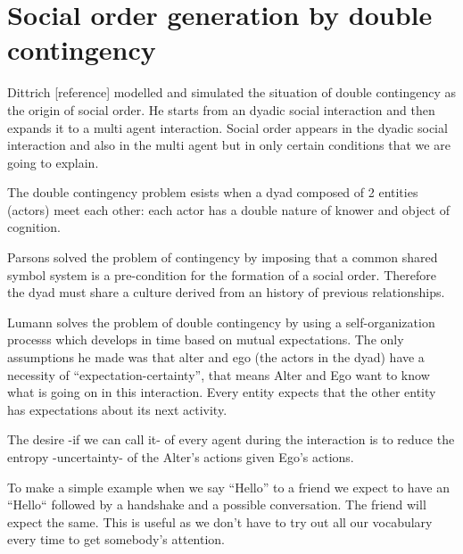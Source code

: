 \documentclass[a4paper,10pt]{article}
\title{}
\author{Paolo}
\begin{document}
\maketitle

\begin{abstract}

\end{abstract}

\section{Social order generation by double contingency}
Dittrich [reference] modelled and simulated the situation of double contingency as the origin of social
order.
He starts from an dyadic social interaction and then expands it to a multi agent interaction.
Social order appears in the dyadic social interaction and also in the multi agent but in only certain conditions
that we are going to explain.

The double contingency problem esists when a dyad composed of 2 entities (actors) meet each other:
each actor has a double nature of knower and object of cognition.

Parsons solved the problem of contingency by imposing that a common shared symbol system
is a pre-condition for the formation of a social order.
Therefore the dyad must share a culture derived from an history of previous relationships.

Lumann solves the problem of double contingency by using a self-organization processs which
develops in time based on mutual expectations.
The only assumptions he made was that alter and ego (the actors in the dyad) have a necessity of ``expectation-certainty'', that means Alter and Ego want to know what is going on in this interaction.
Every entity expects that the other entity has expectations about its next activity.

The desire -if we can call it- of every agent during the interaction is to reduce the entropy -uncertainty- of the
Alter's actions given Ego's actions.

To make a simple example when we say ``Hello'' to a friend we expect to have an ``Hello`` followed by 
a handshake and a possible conversation. The friend will expect the same.
This is useful as we don't have to try out all our vocabulary every time to get somebody's attention.
\end{document}
